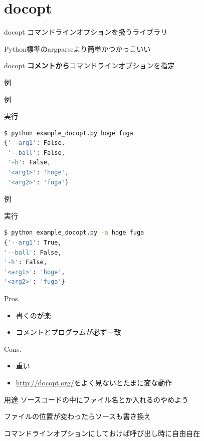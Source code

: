 \documentclass[12pt, xetex, xcolor=pdftex, dvipsnames]{beamer}
\begin{document}
\section{docopt}
\begin{frame}{docopt}
    コマンドラインオプションを扱うライブラリ

    Python標準のargparseより簡単かつかっこいい
\end{frame}
\begin{frame}{docopt}
    \textbf{\alert{コメントから}}コマンドラインオプションを指定
\end{frame}
\begin{frame}[fragile]{例}
    
\end{frame}
\begin{frame}[fragile]{例}
    

    実行
    \begin{lstlisting}[language=Bash]
$ python example_docopt.py hoge fuga
{'--arg1': False,
 '--ball': False,
 '-h': False,
 '<arg1>': 'hoge',
 '<arg2>': 'fuga'}
    \end{lstlisting}
\end{frame}
\begin{frame}[fragile]{例}
    

    実行
    \begin{lstlisting}[language=Bash]
$ python example_docopt.py -a hoge fuga
{'--arg1': True,
'--ball': False,
'-h': False,
'<arg1>': 'hoge',
'<arg2>': 'fuga'}
    \end{lstlisting}
\end{frame}
\begin{frame}
    \begin{block}{Pros.}
        \begin{itemize}
            \item 書くのが楽
            \item コメントとプログラムが必ず一致
        \end{itemize}
    \end{block}
    \begin{block}{Cons.}
        \begin{itemize}
            \item 重い
            \item \url{http://docopt.org/}をよく見ないとたまに変な動作
        \end{itemize}
    \end{block}
\end{frame}
\begin{frame}{用途}
    ソースコードの中にファイル名とか入れるのやめよう

    ファイルの位置が変わったらソースも書き換え

    コマンドラインオプションにしておけば呼び出し時に自由自在
\end{frame}
\end{document}
